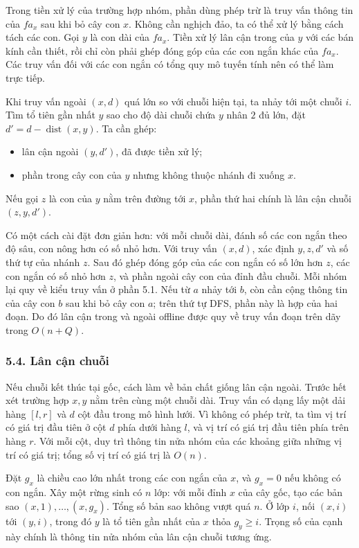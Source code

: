 \documentclass[11pt]{article}
\begin{document}
Trong tiền xử lý của trường hợp nhóm, phần dùng phép trừ là truy vấn thông tin
của \(fa_x\) sau khi bỏ cây con \(x\). Không cần nghịch đảo, ta có thể xử lý
bằng cách tách các con. Gọi \(y\) là con dài của \(fa_x\). Tiền xử lý lân cận
trong của \(y\) với các bán kính cần thiết, rồi chỉ còn phải ghép đóng góp của
các con ngắn khác của \(fa_x\). Các truy vấn đối với các con ngắn có tổng quy
mô tuyến tính nên có thể làm trực tiếp.

Khi truy vấn ngoài \((x,d)\) quá lớn so với chuỗi hiện tại, ta nhảy tới một
chuỗi \(i\). Tìm tổ tiên gần nhất \(y\) sao cho độ dài chuỗi chứa \(y\) nhân
\(2\) đủ lớn, đặt \(d'=d-\operatorname{dist}(x,y)\). Ta cần ghép:
\begin{itemize}
  \item lân cận ngoài \((y,d')\), đã được tiền xử lý;
  \item phần trong cây con của \(y\) nhưng không thuộc nhánh đi xuống \(x\).
\end{itemize}
Nếu gọi \(z\) là con của \(y\) nằm trên đường tới \(x\), phần thứ hai chính là
lân cận chuỗi \((z,y,d')\).

Có một cách cài đặt đơn giản hơn: với mỗi chuỗi dài, đánh số các con ngắn theo
độ sâu, con nông hơn có số nhỏ hơn. Với truy vấn \((x,d)\), xác định \(y,z,d'\)
và số thứ tự của nhánh \(z\). Sau đó ghép đóng góp của các con ngắn có số lớn
hơn \(z\), các con ngắn có số nhỏ hơn \(z\), và phần ngoài cây con của đỉnh
đầu chuỗi. Mỗi nhóm lại quy về kiểu truy vấn ở phần 5.1. Nếu từ \(a\) nhảy tới
\(b\), còn cần cộng thông tin của cây con \(b\) sau khi bỏ cây con \(a\); trên
thứ tự DFS, phần này là hợp của hai đoạn. Do đó lân cận trong và ngoài offline
được quy về truy vấn đoạn trên dãy trong \(O(n+Q)\).

\subsubsection*{5.4. Lân cận chuỗi}

Nếu chuỗi kết thúc tại gốc, cách làm về bản chất giống lân cận ngoài. Trước hết
xét trường hợp \(x,y\) nằm trên cùng một chuỗi dài. Truy vấn có dạng lấy một
dải hàng \([l,r]\) và \(d\) cột đầu trong mô hình lưới. Vì không có phép trừ,
ta tìm vị trí có giá trị đầu tiên ở cột \(d\) phía dưới hàng \(l\), và vị trí
có giá trị đầu tiên phía trên hàng \(r\). Với mỗi cột, duy trì thông tin nửa
nhóm của các khoảng giữa những vị trí có giá trị; tổng số vị trí có giá trị là
\(O(n)\).

Đặt \(g_x\) là chiều cao lớn nhất trong các con ngắn của \(x\), và \(g_x=0\)
nếu không có con ngắn. Xây một rừng sinh có \(n\) lớp: với mỗi đỉnh \(x\) của
cây gốc, tạo các bản sao \((x,1),\ldots,(x,g_x)\). Tổng số bản sao không vượt
quá \(n\). Ở lớp \(i\), nối \((x,i)\) tới \((y,i)\), trong đó \(y\) là tổ tiên
gần nhất của \(x\) thỏa \(g_y\ge i\). Trọng số của cạnh này chính là thông tin
nửa nhóm của lân cận chuỗi tương ứng.
\end{document}
